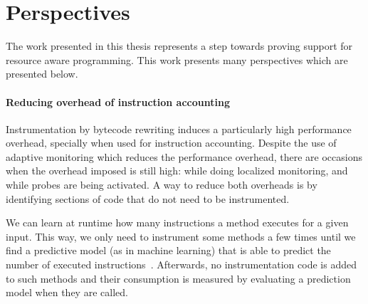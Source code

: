 \section{Perspectives}

The work presented in this thesis represents a step towards proving support for resource aware programming.
This work presents many perspectives which are presented below. 



\paragraph{Reducing overhead of instruction accounting}

Instrumentation by bytecode rewriting induces a particularly high performance overhead, specially when used for instruction accounting.
Despite the use of adaptive monitoring which reduces the performance overhead, there are occasions when the overhead imposed is still high: while doing localized monitoring, and while probes are being activated.
A way to reduce both overheads is by identifying sections of code that do not need to be instrumented.

We can learn at runtime how many instructions a method executes for a given input.
This way, we only need to instrument some methods a few times until we find a predictive model (as in machine learning) that is able to predict the number of executed instructions~\cite{tesauro2006hybrid}.
Afterwards, no instrumentation code is added to such methods and their consumption is measured by evaluating a prediction model when they are called.
 

